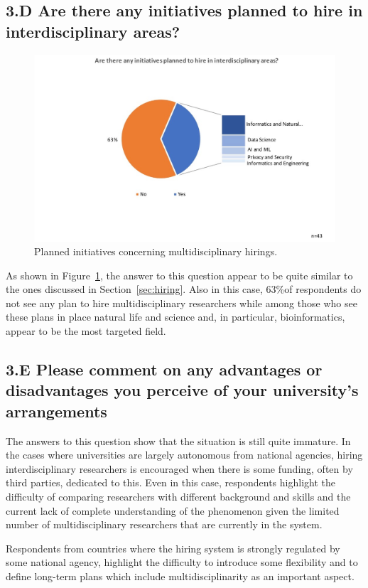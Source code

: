 \subsection{3.D Are there any initiatives planned to hire in interdisciplinary areas?}

\begin{figure}\label{sect3:planned}
\centering
\includegraphics[width = \linewidth]{charts/3d.jpg}
\caption{Planned initiatives concerning multidisciplinary hirings.}
\end{figure}

As shown in Figure~\ref{sect3:planned}, the answer to this question appear to be quite similar to the ones
discussed in Section~\ref{sec:hiring}. Also in this case, 63\%of
respondents do not see any plan to hire multidisciplinary researchers
while among those who see these plans in place natural life and
science and, in particular, bioinformatics, appear to be the most
targeted field. 

\subsection{3.E Please comment on any advantages or disadvantages you
  perceive of your university's arrangements}

The answers to this question show that the situation is still quite
immature. In the cases where universities are largely autonomous from
national agencies, hiring interdisciplinary researchers is
encouraged when there is some funding, often by third parties, dedicated to
this. Even in this case, respondents highlight the difficulty of comparing
researchers with different background and skills and the current
lack of complete understanding of the phenomenon given the limited
number of multidisciplinary researchers that are currently in the
system. 

Respondents from countries where the hiring system is strongly
regulated by some national agency, highlight the difficulty to
introduce some flexibility and to define long-term plans
which include multidisciplinarity as an important aspect. 